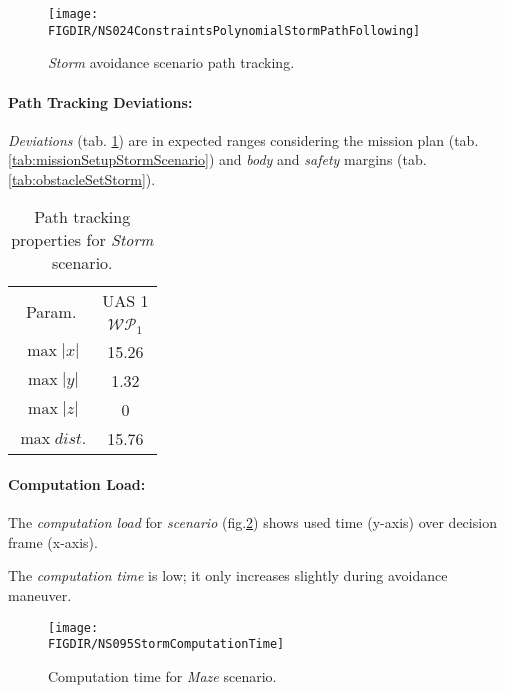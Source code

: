     \begin{figure}[H]
        \centering
        \texttt{[image: \\FIGDIR/NS024ConstraintsPolynomialStormPathFollowing]} 
        \caption{\emph{Storm} avoidance scenario path tracking.}
        \label{fig:testCaseStormPathTracking}
    \end{figure}
    
    \paragraph{Path Tracking Deviations:} \emph{Deviations} (tab. \ref{tab:pathTrackingParametersForStormAvoidance}) are in expected ranges considering the mission plan (tab. \ref{tab:missionSetupStormScenario}) and \emph{body} and \emph{safety} margins (tab. \ref{tab:obstacleSetStorm}).
    
    \begin{table}[H]
        \centering
        \begin{tabular}{c||c}
            \multirow{2}{*}{Param.} & UAS 1\\\cline{2-2}
                            & $\mathscr{WP}_1$  \\\hline\hline
              $\max |x|$    & 15.26             \\\hline
              $\max |y|$    & 1.32             \\\hline
              $\max |z|$    & 0                 \\\hline
              $\max dist.$  & 15.76             \\
        \end{tabular}
        \caption{Path tracking properties for \emph{Storm} scenario.}
        \label{tab:pathTrackingParametersForStormAvoidance}
    \end{table}
    
    
\paragraph{Computation Load:} The \emph{computation load} for \emph{scenario} (fig.\ref{fig:stormComputationTime}) shows used time (y-axis) over decision frame (x-axis).

The \emph{computation time} is low; it only increases slightly during  avoidance maneuver.

\begin{figure}[H]
    \centering
    \texttt{[image: \\FIGDIR/NS095StormComputationTime]} 
    \caption{Computation time for \emph{Maze} scenario.}
    \label{fig:stormComputationTime}
\end{figure}
    
    
